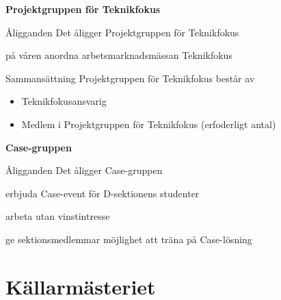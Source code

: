 \documentclass[pdfbookmarks,a4paper,11pt]{article}
\newlength{\itemcollength}
\newenvironment{reglemlista}{%
  \begin{list}{}{%
      \setlength{\labelwidth}{\itemcollength}%
      \setlength{\leftmargin}{\labelwidth + \labelsep}%
      \renewcommand{\makelabel}[1]{%
        \raisebox{0pt}[1ex][0pt]{%
          \makebox[\labelwidth][l]{%
            \parbox[t]{\itemcollength}{%
              \raggedright\hspace{0pt}##1}}}\hfill}%
      }}{%
  \end{list}}
\begin{document}
\textbf{Projektgruppen för Teknikfokus}
\begin{reglemlista}
	\item[Åligganden]
	Det åligger Projektgruppen för Teknikfokus

	\begin{attlista}
		\item på våren anordna arbetsmarknadsmässan Teknikfokus
	\end{attlista}

	\item[Sammansättning]
	Projektgruppen för Teknikfokus består av
	\begin{itemize}
		\item Teknikfokusansvarig
		\item Medlem i Projektgruppen för Teknikfokus (erfoderligt antal)
	\end{itemize}

\end{reglemlista}

\textbf{Case-gruppen}
\begin{reglemlista}
	\item[Åligganden]
	Det åligger Case-gruppen
	\begin{attlista}
		\item erbjuda Case-event för D-sektionens studenter
		\item arbeta utan vinstintresse
		\item ge sektionsmedlemmar möjlighet att träna på Case-lösning
	\end{attlista}

\end{reglemlista}

\section{Källarmästeriet}
\end{document}

